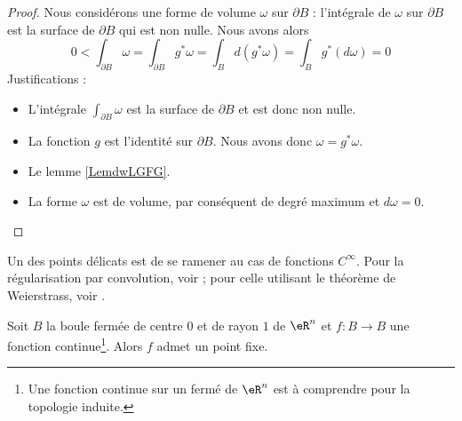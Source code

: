 \begin{proof}
    Nous considérons une forme de volume \( \omega\) sur \( \partial B\) : l'intégrale de \( \omega\) sur \( \partial B\) est la surface de \( \partial B\) qui est non nulle. Nous avons alors
    \begin{equation}
        0<\int_{\partial B}\omega
        =\int_{\partial B}g^*\omega
        =\int_Bd(g^*\omega)
        =\int_Bg^*(d\omega)
        =0
    \end{equation}
    Justifications :
    \begin{itemize}
        \item 
            L'intégrale \( \int_{\partial B}\omega\) est la surface de \( \partial B\) et est donc non nulle.
        \item
            La fonction \( g\) est l'identité sur \( \partial B\). Nous avons donc \( \omega=g^*\omega\).
        \item
            Le lemme \ref{LemdwLGFG}.
        \item
            La forme \( \omega\) est de volume, par conséquent de degré maximum et \( d\omega=0\).
    \end{itemize}
\end{proof}

Un des points délicats est de se ramener au cas de fonctions \( C^{\infty}\). Pour la régularisation par convolution, voir \cite{AllardBrouwer}; pour celle utilisant le théorème de Weierstrass, voir \cite{KuttlerTopInAl}.
\begin{theorem}\label{ThoRGjGdO}
    Soit \( B\) la boule fermée de centre \( 0\) et de rayon \( 1\) de \( \eR^n\) et \( f\colon B\to B\) une fonction continue\footnote{Une fonction continue sur un fermé de \( \eR^n\) est à comprendre pour la topologie induite.}. Alors \( f\) admet un point fixe.
\end{theorem}

